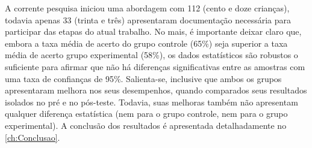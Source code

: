 A corrente pesquisa iniciou uma abordagem com 112 (cento e doze crianças), todavia apenas 33 (trinta e três) apresentaram documentação necessária para participar das etapas do atual trabalho. No mais, é importante deixar claro que, embora a taxa média de acerto do grupo controle (65\%) seja superior a taxa média de acerto grupo experimental (58\%), os dados estatísticos são robustos o suficiente para afirmar que não há diferenças significativas entre as amostras com uma taxa de confianças de 95\%. Salienta-se, inclusive que ambos os grupos apresentaram melhora nos seus desempenhos, quando comparados seus resultados isolados no pré e no pós-teste. Todavia, suas melhoras também não apresentam qualquer diferença estatística (nem para o grupo controle, nem para o grupo experimental). A conclusão dos resultados é apresentada detalhadamente no \autoref{ch:Conclusao}.
